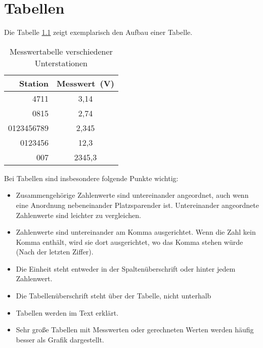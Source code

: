 
\chapter{Tabellen}

Die Tabelle \ref{tab:komma} zeigt exemplarisch den Aufbau einer Tabelle.

\begin{longtable}[c]{|r|c|}
\caption{Messwertabelle verschiedener Unterstationen \label{tab:komma}}
\tabularnewline
\hline 
\textbf{Station} & \textbf{Messwert~(V)}\tabularnewline
\endfirsthead
\hline 
4711 & \hphantom{000}3,14\hphantom{0}\tabularnewline
\hline 
0815 & \phantom{000}2,74\hphantom{0}\tabularnewline
\hline 
0123456789 & \hphantom{000}2,345\tabularnewline
\hline 
0123456 & \hphantom{00}12,3\hphantom{00}\tabularnewline
\hline 
007 & 2345,3\hphantom{00}\tabularnewline
\hline 
\end{longtable}

Bei Tabellen sind insbesondere folgende Punkte wichtig:
\begin{itemize}
\item Zusammengehörige Zahlenwerte sind untereinander angeordnet, auch wenn
eine Anordnung nebeneinander Platzsparender ist. Untereinander angeordnete
Zahlenwerte sind leichter zu vergleichen.
\item Zahlenwerte sind untereinander am Komma ausgerichtet. Wenn die Zahl
kein Komma enthält, wird sie dort ausgerichtet, wo das Komma stehen
würde (Nach der letzten Ziffer).
\item Die Einheit steht entweder in der Spaltenüberschrift oder hinter jedem
Zahlenwert.
\item Die Tabellenüberschrift steht über der Tabelle, nicht unterhalb
\item Tabellen werden im Text erklärt.
\item Sehr große Tabellen mit Messwerten oder gerechneten Werten werden
häufig besser als Grafik dargestellt.
\end{itemize}

